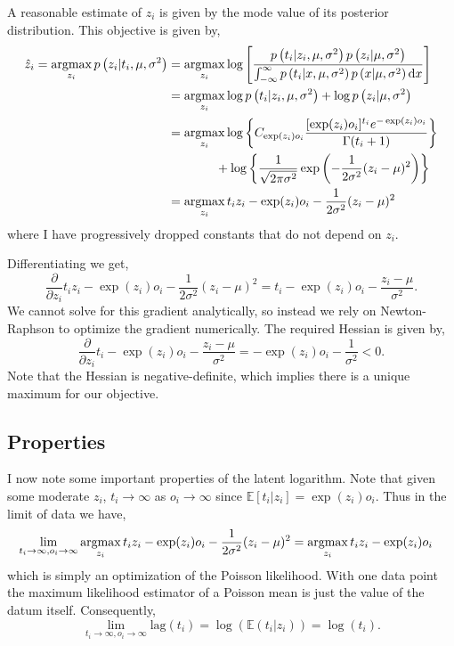\documentclass[11pt]{article}
\newcommand{\argmax}{\operatornamewithlimits{argmax}}
\begin{document}
A reasonable estimate of $z_i$ is given by the mode value of its posterior distribution. This objective is given by,
\begin{align*}
\hat{z}_i = \argmax_{z_i} p\left(z_i|t_i,\mu, \sigma^2 \right) & = \argmax_{z_i} \log \left[ \frac{ p\left(t_i|z_i,\mu, \sigma^2 \right)p\left(z_i |\mu, \sigma^2 \right) }{ \int_{-\infty}^{\infty} p\left(t_i|x,\mu, \sigma^2 \right)p\left(x |\mu, \sigma^2 \right) \textrm{d}x } \right] \\
& = \argmax_{z_i} \log  p\left(t_i|z_i,\mu, \sigma^2 \right) + \log p\left(z_i |\mu, \sigma^2 \right)  \\
& = \argmax_{z_i} \log\left\{ C_{\exp(z_i)o_i} \frac{ [\exp(z_i)o_i]^{t_i} e^{-\exp(z_i)o_i}}{\Gamma(t_i + 1)}\right\} \\ 
& \hspace{13.5mm} + \log\left\{ \frac{1}{\sqrt{2\pi\sigma^2}} \exp\left( -\frac{1}{2\sigma^2}(z_i - \mu)^2 \right) \right\} \\
& = \argmax_{z_i} t_i z_i - \exp(z_i)o_i -\frac{1}{2\sigma^2}(z_i - \mu)^2 
\end{align*}
where I have progressively dropped constants that do not depend on $z_i$. 

Differentiating we get, 
\[
\frac{\partial}{\partial z_i} t_i z_i - \exp(z_i)o_i -\frac{1}{2\sigma^2}(z_i - \mu)^2 = t_i - \exp(z_i)o_i -\frac{z_i - \mu}{\sigma^2}.
\]
We cannot solve for this gradient analytically, so instead we rely on Newton-Raphson to optimize the gradient numerically. The required Hessian is given by,
\[
\frac{\partial}{\partial z_i} t_i - \exp(z_i)o_i -\frac{z_i - \mu}{\sigma^2} = - \exp(z_i)o_i -\frac{1}{\sigma^2} < 0 .
\]
Note that the Hessian is negative-definite, which implies there is a unique maximum for our objective.  

\subsection{Properties}

I now note some important properties of the latent logarithm. Note that given some moderate $z_i$, $t_i \rightarrow \infty$ as $o_i \rightarrow \infty$ since $\mathbb{E}[t_i|z_i] = \exp(z_i)o_i$. Thus in the limit of data we have, 
\begin{align*}
&  \lim_{t_i \to \infty, o_i \to \infty} \argmax_{z_i} t_i z_i - \exp(z_i)o_i -\frac{1}{2\sigma^2}(z_i - \mu)^2 = \argmax_{z_i} t_i z_i - \exp(z_i)o_i
\end{align*}
which is simply an optimization of the Poisson likelihood. With one data point the maximum likelihood estimator of a Poisson mean is just the value of the datum itself. Consequently, 
\[
\lim_{t_i \to \infty,o_i \to \infty}\textrm{lag}(t_i) = \log(\mathbb{E}(t_i|z_i)) = \log(t_i).   
\]
\end{document}
